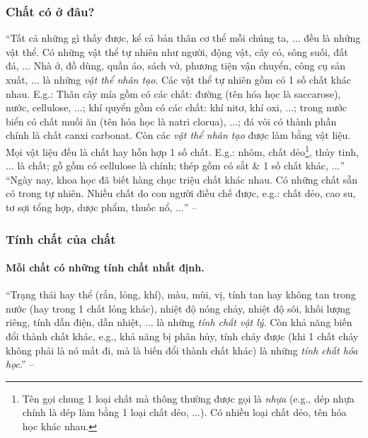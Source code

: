 \documentclass{article}
\numberwithin{equation}{section}
\begin{document}
\subsubsection{Chất có ở đâu?}
``Tất cả những gì thấy được, kể cả bản thân cơ thể mỗi chúng ta, $\ldots$ đều là những vật thể. Có những vật thể tự nhiên như người, động vật, cây cỏ, sông suối, đất đá, $\ldots$ Nhà ở, đồ dùng, quần áo, sách vở, phương tiện vận chuyển, công cụ sản xuất, $\ldots$ là những \textit{vật thể nhân tạo}. Các vật thể tự nhiên gồm có 1 số chất khác nhau. E.g.: Thân cây mía gồm có các chất: đường (tên hóa học là saccarose), nước, cellulose, $\ldots$; khí quyển gồm có các chất: khí nitơ, khí oxi, $\ldots$; trong nước biển có chất muối ăn (tên hóa học là natri clorua), $\ldots$; đá vôi có thành phần chính là chất canxi carbonat. Còn các \textit{vật thể nhân tạo} được làm bằng vật liệu. Mọi vật liệu đều là chất hay hỗn hợp 1 số chất. E.g.: nhôm, chất dẻo\footnote{Tên gọi chung 1 loại chất mà thông thường được gọi là \textit{nhựa} (e.g., dép nhựa chính là dép làm bằng 1 loại chất dẻo, $\ldots$). Có nhiều loại chất dẻo, tên hóa học khác nhau.}, thủy tinh, $\ldots$ là chất; gỗ gồm có cellulose là chính; thép gồm có sắt \& 1 số chất khác, $\ldots$'' ``Ngày nay, khoa học đã biết hàng chục triệu chất khác nhau. Có những chất sẵn có trong tự nhiên. Nhiều chất do con người điều chế được, e.g.: chất dẻo, cao su, tơ sợi tổng hợp, dược phẩm, thuốc nổ, $\ldots$'' -- \cite[p. 7]{SGK_Hoa_Hoc_8}

\subsubsection{Tính chất của chất}

\paragraph{Mỗi chất có những tính chất nhất định.} ``Trạng thái hay thể (rắn, lỏng, khí), màu, mùi, vị, tính tan hay không tan trong nước (hay trong 1 chất lỏng khác), nhiệt độ nóng chảy, nhiệt độ sôi, khối lượng riêng, tính dẫn điện, dẫn nhiệt, $\ldots$ là những \textit{tính chất vật lý}. Còn khả năng biến đổi thành chất khác, e.g., khả năng bị phân hủy, tính cháy được (khi 1 chất cháy không phải là nó mất đi, mà là biến đổi thành chất khác) là những \textit{tính chất hóa học}.'' -- \cite[p. 8]{SGK_Hoa_Hoc_8}
\end{document}
